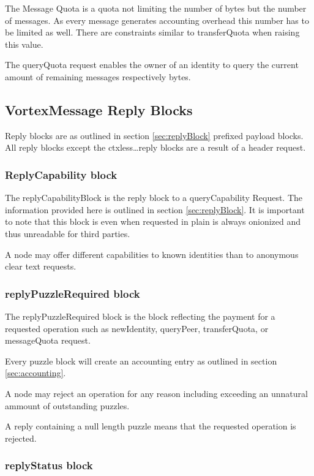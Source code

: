 The Message Quota is a quota not limiting the number of bytes but the number of messages. As every message generates accounting overhead this number has to be limited as well. There are constraints similar to transferQuota when raising this value.

The queryQuota request enables the owner of an identity to query the current amount of remaining messages respectively bytes.

\subsection{VortexMessage Reply Blocks}
Reply blocks are as outlined in section \ref{sec:replyBlock} prefixed payload blocks. All reply blocks except the ctxless\ldots reply blocks are a result of a header request.

\subsubsection{ReplyCapability block}
The replyCapabilityBlock is the reply block to a queryCapability Request. The information provided here is outlined in section \ref{sec:replyBlock}. It is important to note that this block is even when requested in plain is always onionized and thus unreadable for third parties. 

A node may offer different capabilities to known identities than to anonymous clear text requests.

\subsubsection{replyPuzzleRequired block}
The replyPuzzleRequired block is the block reflecting the payment for a requested operation such as newIdentity, queryPeer, transferQuota, or messageQuota request.

Every puzzle block will create an accounting entry as outlined in section \ref{sec:accounting}. 

A node may reject an operation for any reason including exceeding an unnatural ammount of outstanding puzzles.

A reply containing a null length puzzle means that the requested operation is rejected.


\subsubsection{replyStatus block}

